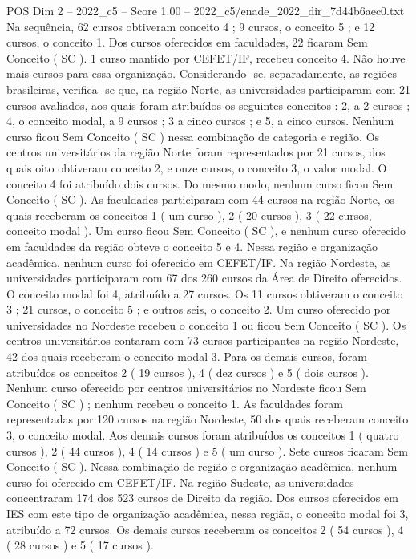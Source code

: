 \begin{textsample}{POS Dim 2 – 2022\_c5 – Score 1.00 – 2022\_c5/enade\_2022\_dir\_7d44b6aec0.txt}
Na sequência, 62 cursos obtiveram conceito 4 ; 9 cursos, o conceito 5 ; e 12 cursos, o conceito 1.
Dos cursos oferecidos em faculdades, 22 ficaram Sem Conceito ( SC ). 1 curso mantido por CEFET/IF, recebeu conceito 4.
Não houve mais cursos para essa organização.
Considerando -se, separadamente, as regiões brasileiras, verifica -se que, na região Norte, as universidades participaram com 21 cursos avaliados, aos quais foram atribuídos os seguintes conceitos : 2, a 2 cursos ; 4, o conceito modal, a 9 cursos ; 3 a cinco cursos ; e 5, a cinco cursos.
Nenhum curso ficou Sem Conceito ( SC ) nessa combinação de categoria e região.
Os centros universitários da região Norte foram representados por 21 cursos, dos quais oito obtiveram conceito 2, e onze cursos, o conceito 3, o valor modal.
O conceito 4 foi atribuído dois cursos.
Do mesmo modo, nenhum curso ficou Sem Conceito ( SC ).
As faculdades participaram com 44 cursos na região Norte, os quais receberam os conceitos 1 ( um curso ), 2 ( 20 cursos ), 3 ( 22 cursos, conceito modal ).
Um curso ficou Sem Conceito ( SC ), e nenhum curso oferecido em faculdades da região obteve o conceito 5 e 4.
Nessa região e organização acadêmica, nenhum curso foi oferecido em CEFET/IF.
Na região Nordeste, as universidades participaram com 67 dos 260 cursos da Área de Direito oferecidos.
O conceito modal foi 4, atribuído a 27 cursos.
Os 11 cursos obtiveram o conceito 3 ; 21 cursos, o conceito 5 ; e outros seis, o conceito 2.
Um curso oferecido por universidades no Nordeste recebeu o conceito 1 ou ficou Sem Conceito ( SC ).
Os centros universitários contaram com 73 cursos participantes na região Nordeste, 42 dos quais receberam o conceito modal 3.
Para os demais cursos, foram atribuídos os conceitos 2 ( 19 cursos ), 4 ( dez cursos ) e 5 ( dois cursos ).
Nenhum curso oferecido por centros universitários no Nordeste ficou Sem Conceito ( SC ) ; nenhum recebeu o conceito 1.
As faculdades foram representadas por 120 cursos na região Nordeste, 50 dos quais receberam conceito 3, o conceito modal.
Aos demais cursos foram atribuídos os conceitos 1 ( quatro cursos ), 2 ( 44 cursos ), 4 ( 14 cursos ) e 5 ( um curso ).
Sete cursos ficaram Sem Conceito ( SC ).
Nessa combinação de região e organização acadêmica, nenhum curso foi oferecido em CEFET/IF.
Na região Sudeste, as universidades concentraram 174 dos 523 cursos de Direito da região.
Dos cursos oferecidos em IES com este tipo de organização acadêmica, nessa região, o conceito modal foi 3, atribuído a 72 cursos.
Os demais cursos receberam os conceitos 2 ( 54 cursos ), 4 ( 28 cursos ) e 5 ( 17 cursos ).

\end{textsample}

